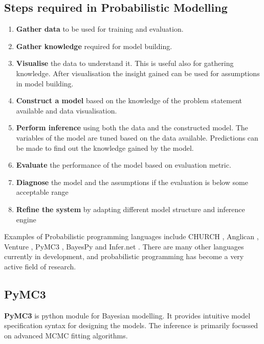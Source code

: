 \subsection*{Steps required in Probabilistic Modelling \cite{winn2016}}
\label{sub:steps}
\begin{enumerate}
	\item \textbf{Gather data} to be used for training and evaluation.
    \item \textbf{Gather knowledge} required for model building.
    \item \textbf{Visualise} the data to understand it. This is useful also for gathering knowledge. After visualisation the insight gained can be used for assumptions in model building.
    \item \textbf{Construct a model} based on the knowledge of the problem statement available and data visualisation. 
    \item \textbf{Perform inference} using both the data and the constructed model. The variables of the model are tuned based on the data available. Predictions can be made to find out the knowledge gained by the model.
    \item \textbf{Evaluate} the performance of the model based on evaluation metric.
    \item \textbf{Diagnose} the model and the assumptions if the evaluation is below some acceptable range
    \item \textbf{Refine the system} by adapting different model structure and inference engine

\end{enumerate}

Examples of Probabilistic programming languages include CHURCH \cite{goodman_church_2012}, Anglican \cite{wood2014new},  Venture \cite{mansinghka_venture_2014}, PyMC3 \cite{salvatier_probabilistic_2015}, BayesPy \cite{luttinen_bayespy_2014} and Infer.net \cite{minka_2010}. There are many other languages currently in development, and probabilistic programming has become a very active field of research.

\subsection{PyMC3}

\textbf{PyMC3} is python module for Bayesian modelling. It provides intuitive model specification syntax for designing the models. The inference is primarily focussed on advanced MCMC fitting algorithms.


